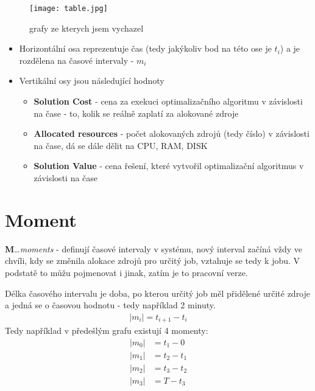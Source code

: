\documentclass[11pt]{article}
\begin{document}
    \begin{figure}[ht!]
        \centering
        \texttt{[image: table.jpg]}
        \caption{grafy ze kterych jsem vychazel}
    \end{figure}

    \newpage

    \begin{itemize}
        \item Horizontální osa reprezentuje čas (tedy jakýkoliv bod na této ose je $t_i$) a je rozdělena na časové intervaly - $m_i$
        \item Vertikální osy jsou následující hodnoty
        \begin{itemize}
            \item \textbf{Solution Cost} - cena za exekuci optimalizačního algoritmu v závislosti na čase - to, kolik se reálně zaplatí za alokované zdroje
            \item \textbf{Allocated resources} - počet alokovaných zdrojů (tedy číslo) v závislosti na čase, dá se dále dělit na CPU, RAM, DISK
            \item \textbf{Solution Value} - cena řešení, které vytvořil optimalizační algoritmus v závislosti na čase
        \end{itemize}
    \end{itemize}

    \section{Moment}\label{sec:m}
    \textbf{M}\ldots\textit{moments} - definují časové intervaly v systému, nový interval začíná vždy ve chvíli, kdy se změnila alokace zdrojů pro určitý job,
    vztahuje se tedy k jobu.
    V podstatě to můžu pojmenovat i jinak, zatím je to pracovní verze.

    Délka časového intervalu je doba, po kterou určitý job měl přidělené určité zdroje a jedná se o časovou hodnotu - tedy například 2 minuty.
    \begin{align*}
        | m_i | = t_{i+1} - t_i
    \end{align*}
    Tedy například v předešlým grafu existují 4 momenty:
    \begin{align*}
        | m_0 | &= t_{1} - 0\\
        | m_1 | &= t_{2} - t_{1}\\
        | m_2 | &= t_{3} - t_{2}\\
        | m_3 | &= T - t_{3}
    \end{align*}
\end{document}
